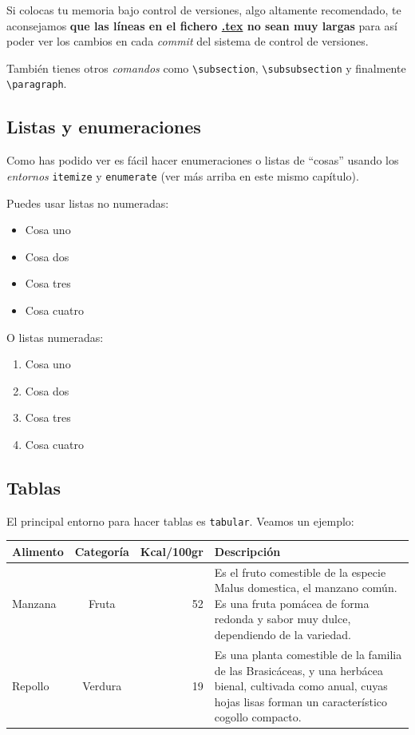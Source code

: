 Si colocas tu memoria bajo control de versiones, algo altamente
recomendado, te aconsejamos \textbf{que las líneas en el fichero \url{.tex} no
sean muy largas} para así poder ver los cambios en cada \emph{commit}
del sistema de control de versiones.

También tienes otros \emph{comandos} como \verb|\subsection|,
\verb|\subsubsection| y finalmente \verb|\paragraph|.

\subsection{Listas y enumeraciones}

Como has podido ver es fácil hacer enumeraciones o listas de ``cosas''
usando los \emph{entornos} \verb|itemize| y \verb|enumerate| (ver
más arriba en este mismo capítulo).

Puedes usar listas no numeradas:
\begin{itemize}
\item Cosa uno
\item Cosa dos
\item Cosa tres
\item Cosa cuatro
\end{itemize}

O listas numeradas:
\begin{enumerate}
\item Cosa uno
\item Cosa dos
\item Cosa tres
\item Cosa cuatro
\end{enumerate}


\subsection{Tablas}
El principal entorno para hacer tablas es \verb!tabular!. Veamos un ejemplo:

\begin{tabular}{||l|c|r|p{15em}||}
  \hline
  \hline
  \textbf{Alimento} & \textbf{Categoría} & \textbf{Kcal/100gr} & \textbf{Descripción}\\
  \hline
  \hline
  Manzana & Fruta & 52 & Es el fruto comestible de la especie Malus domestica, el manzano común. Es una fruta pomácea de forma redonda y sabor muy dulce, dependiendo de la variedad.\\
  \hline
  Repollo & Verdura & 19 & Es una planta comestible de la familia de las Brasicáceas, y una herbácea bienal, cultivada como anual, cuyas hojas lisas forman un característico cogollo compacto.\\
  \hline
  \hline
\end{tabular}

